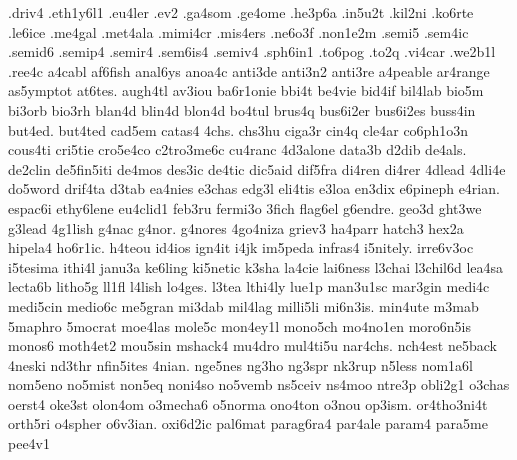 .driv4
.eth1y6l1
.eu4ler
.ev2
.ga4som
.ge4ome
.he3p6a
.in5u2t
.kil2ni
.ko6rte
.le6ice
.me4gal
.met4ala
.mimi4cr
.mis4ers
.ne6o3f
.non1e2m
.semi5
.sem4ic
.semid6
.semip4
.semir4
.sem6is4
.semiv4
.sph6in1
.to6pog
.to2q
.vi4car
.we2b1l
.ree4c
a4cabl
af6fish
anal6ys
anoa4c
anti3de
anti3n2
anti3re
a4peable
ar4range
as5ymptot
at6tes.
augh4tl
av3iou
ba6r1onie
bbi4t
be4vie
bid4if
bil4lab
bio5m
bi3orb
bio3rh
blan4d
blin4d
blon4d
bo4tul
brus4q
bus6i2er
bus6i2es
buss4in
but4ed.
but4ted
cad5em
catas4
4chs.
chs3hu
ciga3r
cin4q
cle4ar
co6ph1o3n
cous4ti
cri5tie
cro5e4co
c2tro3me6c
cu4ranc
4d3alone
data3b
d2dib
de4als.
de2clin
de5fin5iti
de4mos
des3ic
de4tic
dic5aid
dif5fra
di4ren
di4rer
4dlead
4dli4e
do5word
drif4ta
d3tab
ea4nies
e3chas
edg3l
eli4tis
e3loa
en3dix
e6pineph
e4rian.
espac6i
ethy6lene
eu4clid1
feb3ru
fermi3o
3fich
flag6el
g6endre.
geo3d
ght3we
g3lead
4g1lish
g4nac
g4nor.
g4nores
4go4niza
griev3
ha4parr
hatch3
hex2a
hipela4
ho6r1ic.
h4teou
id4ios
ign4it
i4jk
im5peda
infras4
i5nitely.
irre6v3oc
i5tesima
ithi4l
janu3a
ke6ling
ki5netic
k3sha
la4cie
lai6ness
l3chai
l3chil6d
lea4sa
lecta6b
litho5g
ll1fl
l4lish
lo4ges.
l3tea
lthi4ly
lue1p
man3u1sc
mar3gin
medi4c
medi5cin
medio6c
me5gran
mi3dab
mil4lag
milli5li
mi6n3is.
min4ute
m3mab
5maphro
5mocrat
moe4las
mole5c
mon4ey1l
mono5ch
mo4no1en
moro6n5is
monos6
moth4et2
mou5sin
mshack4
mu4dro
mul4ti5u
nar4chs.
nch4est
ne5back
4neski
nd3thr
nfin5ites
4nian.
nge5nes
ng3ho
ng3spr
nk3rup
n5less
nom1a6l
nom5eno
no5mist
non5eq
noni4so
no5vemb
ns5ceiv
ns4moo
ntre3p
obli2g1
o3chas
oerst4
oke3st
olon4om
o3mecha6
o5norma
ono4ton
o3nou
op3ism.
or4tho3ni4t
orth5ri
o4spher
o6v3ian.
oxi6d2ic
pal6mat
parag6ra4
par4ale
param4
para5me
pee4v1
